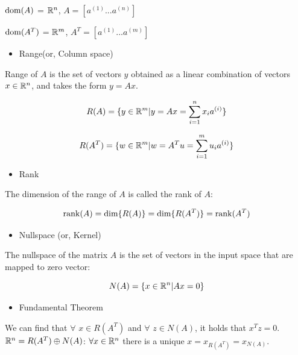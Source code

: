 ${\rm dom}(A)$ = $\mathbb{R}^n$, $A = [a^{(1)}...a^{(n)}]$

${\rm dom}(A^T)$ = $\mathbb{R}^m$, $A^T = [a^{(1)}...a^{(m)}]$


\begin{itemize}
	\item Range(or, Column space)
\end{itemize}

Range of $A$ is the set of vectors $y$ obtained as a linear combination of vectors $x\in \mathbb{R}^n$, and takes the form $y= Ax$.

\begin{equation*}
R(A) = \{y\in \mathbb{R}^m | y = Ax = \sum^n_{i=1}x_ia^{(i)}\}
\end{equation*}

\begin{equation*}
R(A^T) = \{w\in \mathbb{R}^m | w = A^Tu = \sum^m_{i=1}u_ia^{(i)}\}
\end{equation*}

\begin{itemize}
	\item Rank
\end{itemize}

The dimension of the range of $A$ is called the rank of $A$:

\begin{equation*}
\operatorname{rank}(A) = \text{dim}\{R(A)\} = \text{dim}\{R(A^T)\} =\operatorname{rank}(A^T)
\end{equation*}

\begin{itemize}
	\item Nullspace (or, Kernel)
\end{itemize}

The nullspace of the matrix $A$ is the set of vectors in the input space that are mapped to zero vector:

\begin{equation*}
N(A) = \{x\in \mathbb{R}^n | Ax = 0\}
\end{equation*}

\begin{itemize}
	\item Fundamental Theorem
\end{itemize}

We can find that $\forall$ $x\in R(A^T)$ and $\forall$ $z\in N(A)$, it holds that $x^Tz = 0$.\\

$\mathbb{R}^n = R(A^T) \oplus N(A)$: $\forall x\in \mathbb{R}^n$ there is a unique $x = x_{R(A^T)} = x_{N(A)}$.\\

